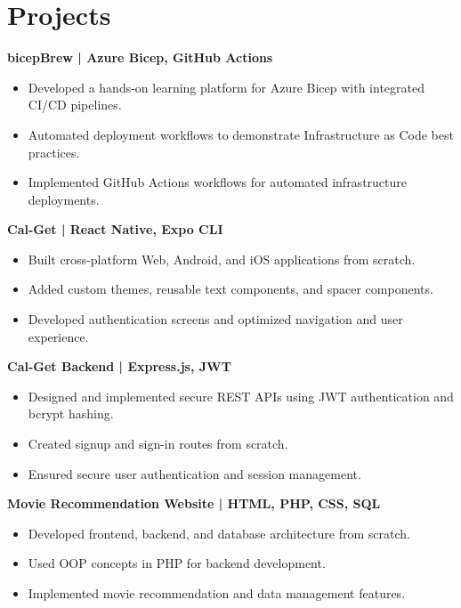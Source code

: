 \documentclass[a4paper,10pt]{article}
\begin{document}
\section*{Projects}

\textbf{bicepBrew | Azure Bicep, GitHub Actions}

\begin{itemize}[leftmargin=*]
    \item Developed a hands-on learning platform for Azure Bicep with integrated CI/CD pipelines.
    \item Automated deployment workflows to demonstrate Infrastructure as Code best practices.
    \item Implemented GitHub Actions workflows for automated infrastructure deployments.
\end{itemize}

\textbf{Cal-Get | React Native, Expo CLI}

\begin{itemize}[leftmargin=*]
    \item Built cross-platform Web, Android, and iOS applications from scratch.
    \item Added custom themes, reusable text components, and spacer components.
    \item Developed authentication screens and optimized navigation and user experience.
\end{itemize}

\textbf{Cal-Get Backend | Express.js, JWT}

\begin{itemize}[leftmargin=*]
    \item Designed and implemented secure REST APIs using JWT authentication and bcrypt hashing.
    \item Created signup and sign-in routes from scratch.
    \item Ensured secure user authentication and session management.
\end{itemize}

\textbf{Movie Recommendation Website | HTML, PHP, CSS, SQL}

\begin{itemize}[leftmargin=*]
    \item Developed frontend, backend, and database architecture from scratch.
    \item Used OOP concepts in PHP for backend development.
    \item Implemented movie recommendation and data management features.
\end{itemize}
\end{document}
